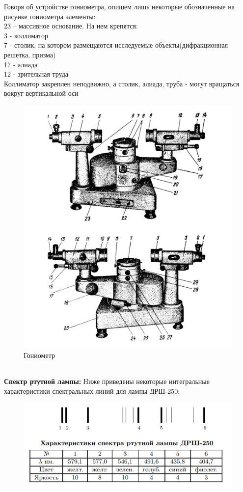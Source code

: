 \documentclass[a4paper,12pt]{article}
\begin{document}
Говоря об устройстве гониометра, опишем лишь некоторые обозначенные на рисунке гониометра элементы:\\ 
23 -- массивное основание. На нем крепятся:\\
3 - коллиматор\\
7 - столик, на котором размещаются исследуемые объекты(дифракционная решетка, призма)\\
17 - алиада\\
12 - зрительная труда \\
Коллиматор закреплен неподвижно, а столик, алиада, труба - могут вращаться вокруг вертикальной оси
\begin{figure}[h!]
\centering
\includegraphics[scale=0.7]{goniometr.png}
\caption{Гониометр} 
\end{figure}\\
\textbf{Спектр ртутной лампы:}
Ниже приведены некоторые интегральные характеристики спектральных линий для лампы ДРШ-250:
\begin{figure}[h!]
\centering
\includegraphics[scale=1]{spectr.png} 
\end{figure}
\end{document}

